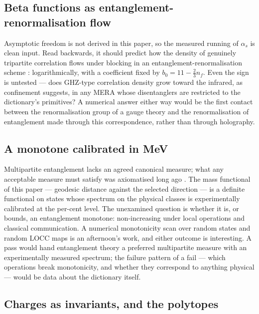 \subsection{Beta functions as entanglement-renormalisation flow}
\label{app:rev-beta}

Asymptotic freedom \autocite{grosswilczek1973ultraviolet, politzer1973reliable} is not
derived in this paper, so the measured running of $\alpha_{s}$ is clean input. Read
backwards, it should predict how the density of genuinely tripartite correlation flows
under blocking in an entanglement-renormalisation scheme
\autocite{vidal2007renormalization}: logarithmically, with a coefficient fixed by
$b_{0} = 11 - \tfrac{2}{3}n_{f}$. Even the sign is untested --- does GHZ-type
correlation density grow toward the infrared, as confinement suggests, in any MERA whose
disentanglers are restricted to the dictionary's primitives? A numerical answer either
way would be the first contact between the renormalisation group of a gauge theory and
the renormalisation of entanglement made through this correspondence, rather than
through holography.

\subsection{A monotone calibrated in MeV}
\label{app:rev-monotone}

Multipartite entanglement lacks an agreed canonical measure; what any acceptable measure
must satisfy was axiomatised long ago \autocite{vidal2000monotones}. The mass functional
of this paper --- geodesic distance against the selected direction --- is a definite
functional on states whose spectrum on the physical classes is experimentally calibrated
at the per-cent level. The unexamined question is whether it is, or bounds, an
entanglement monotone: non-increasing under local operations and classical
communication. A numerical monotonicity scan over random states and random LOCC maps is
an afternoon's work, and either outcome is interesting. A pass would hand entanglement
theory a preferred multipartite measure with an experimentally measured spectrum; the
failure pattern of a fail --- which operations break monotonicity, and whether they
correspond to anything physical --- would be data about the dictionary itself.

\subsection{Charges as invariants, and the polytopes}
\label{app:rev-polytopes}

